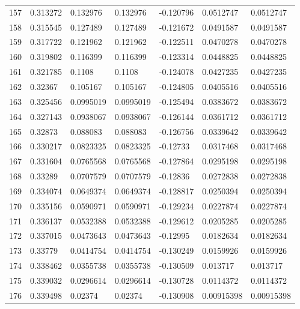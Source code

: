 \begin{longtable}{l|lll|lll}
 157 &  0.313272    & 0.132976    & 0.132976    & -0.120796    & 0.0512747   & 0.0512747   \\
 158 &  0.315545    & 0.127489    & 0.127489    & -0.121672    & 0.0491587   & 0.0491587   \\
 159 &  0.317722    & 0.121962    & 0.121962    & -0.122511    & 0.0470278   & 0.0470278   \\
 160 &  0.319802    & 0.116399    & 0.116399    & -0.123314    & 0.0448825   & 0.0448825   \\
 161 &  0.321785    & 0.1108      & 0.1108      & -0.124078    & 0.0427235   & 0.0427235   \\
 162 &  0.32367     & 0.105167    & 0.105167    & -0.124805    & 0.0405516   & 0.0405516   \\
 163 &  0.325456    & 0.0995019   & 0.0995019   & -0.125494    & 0.0383672   & 0.0383672   \\
 164 &  0.327143    & 0.0938067   & 0.0938067   & -0.126144    & 0.0361712   & 0.0361712   \\
 165 &  0.32873     & 0.088083    & 0.088083    & -0.126756    & 0.0339642   & 0.0339642   \\
 166 &  0.330217    & 0.0823325   & 0.0823325   & -0.12733     & 0.0317468   & 0.0317468   \\
 167 &  0.331604    & 0.0765568   & 0.0765568   & -0.127864    & 0.0295198   & 0.0295198   \\
 168 &  0.33289     & 0.0707579   & 0.0707579   & -0.12836     & 0.0272838   & 0.0272838   \\
 169 &  0.334074    & 0.0649374   & 0.0649374   & -0.128817    & 0.0250394   & 0.0250394   \\
 170 &  0.335156    & 0.0590971   & 0.0590971   & -0.129234    & 0.0227874   & 0.0227874   \\
 171 &  0.336137    & 0.0532388   & 0.0532388   & -0.129612    & 0.0205285   & 0.0205285   \\
 172 &  0.337015    & 0.0473643   & 0.0473643   & -0.12995     & 0.0182634   & 0.0182634   \\
 173 &  0.33779     & 0.0414754   & 0.0414754   & -0.130249    & 0.0159926   & 0.0159926   \\
 174 &  0.338462    & 0.0355738   & 0.0355738   & -0.130509    & 0.013717    & 0.013717    \\
 175 &  0.339032    & 0.0296614   & 0.0296614   & -0.130728    & 0.0114372   & 0.0114372   \\
 176 &  0.339498    & 0.02374     & 0.02374     & -0.130908    & 0.00915398  & 0.00915398  \\

\end{longtable}
